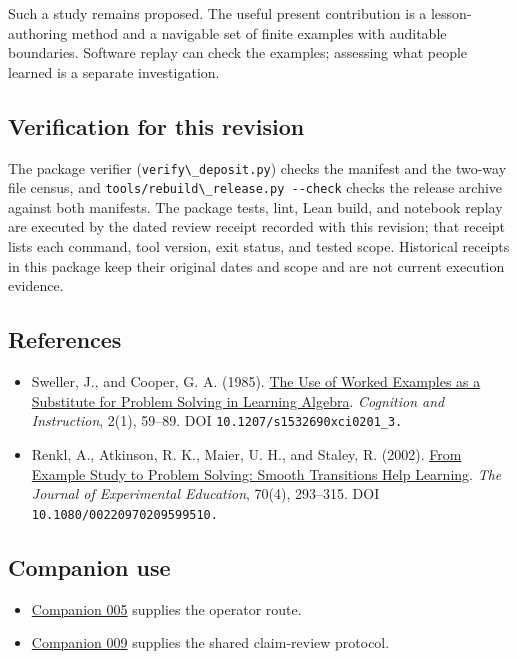 \documentclass[
  11pt,
]{article}
\newcommand{\passthrough}[1]{#1}
\providecommand{\tightlist}{%
  \setlength{\itemsep}{0pt}\setlength{\parskip}{0pt}}
\begin{document}
Such a study remains proposed. The useful present contribution is a
lesson-authoring method and a navigable set of finite examples with
auditable boundaries. Software replay can check the examples; assessing
what people learned is a separate investigation.

\subsection{Verification for this
revision}\label{verification-for-this-revision}

The package verifier (\passthrough{\lstinline!verify\_deposit.py!})
checks the manifest and the two-way file census, and
\passthrough{\lstinline!tools/rebuild\_release.py --check!} checks the
release archive against both manifests. The package tests, lint, Lean
build, and notebook replay are executed by the dated review receipt
recorded with this revision; that receipt lists each command, tool
version, exit status, and tested scope. Historical receipts in this
package keep their original dates and scope and are not current
execution evidence.

\subsection{References}\label{references}

\begin{itemize}
\tightlist
\item
  Sweller, J., and Cooper, G. A. (1985).
  \href{https://doi.org/10.1207/s1532690xci0201_3}{The Use of Worked
  Examples as a Substitute for Problem Solving in Learning Algebra}.
  \emph{Cognition and Instruction}, 2(1), 59--89. DOI
  \nolinkurl{10.1207/s1532690xci0201_3.}
\item
  Renkl, A., Atkinson, R. K., Maier, U. H., and Staley, R. (2002).
  \href{https://doi.org/10.1080/00220970209599510}{From Example Study to
  Problem Solving: Smooth Transitions Help Learning}. \emph{The Journal
  of Experimental Education}, 70(4), 293--315. DOI
  \nolinkurl{10.1080/00220970209599510.}
\end{itemize}

\subsection{Companion use}\label{companion-use}

\begin{itemize}
\tightlist
\item
  \href{../005/paper.pdf}{Companion 005} supplies the operator route.
\item
  \href{../009/paper.pdf}{Companion 009} supplies the shared
  claim-review protocol.
\end{itemize}
\end{document}
